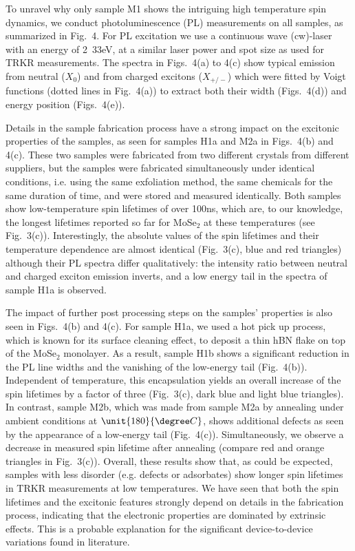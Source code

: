 \documentclass[prb,aps,superscriptaddress,reprint]{revtex4-1}
\begin{document}
To unravel why only sample M1 shows the intriguing high temperature spin dynamics, we conduct photoluminescence (PL) measurements on all samples, as summarized in Fig.~4. For PL excitation we use a continuous wave (cw)-laser with an energy of \unit{2.33}{eV}, at a similar laser power and spot size as used for TRKR measurements. The spectra in Figs.~4(a) to 4(c) show typical emission from neutral ($X_0$) and from charged excitons ($X_{+/-}$) which were fitted by Voigt functions (dotted lines in Fig.~4(a)) to extract both their width (Figs.~4(d)) and energy position (Figs.~4(e)).

Details in the sample fabrication process have a strong impact on the excitonic properties of the samples, as seen for samples H1a and M2a in Figs.~4(b) and 4(c). These two samples were fabricated from two different crystals from different suppliers, but the samples were fabricated simultaneously under identical conditions, i.e. using the same exfoliation method, the same chemicals for the same duration of time, and were stored and measured identically. Both samples show low-temperature spin lifetimes of over \unit{100}{ns}, which are, to our knowledge, the longest lifetimes reported so far for MoSe$_2$ at these temperatures (see Fig.~3(c)). Interestingly, the absolute values of the spin lifetimes and their temperature dependence are almost identical (Fig.~3(c), blue and red triangles) although their PL spectra differ qualitatively: the intensity ratio between neutral and charged exciton emission inverts, and a low energy tail in the spectra of sample H1a is observed. 

The impact of further post processing steps on the samples' properties is also seen in Figs.~4(b) and 4(c). For sample H1a, we used a hot pick up process, which is known for its surface cleaning effect,\cite{arXiv180300912P} to deposit a thin hBN flake on top of the MoSe$_2$ monolayer. As a result, sample H1b shows a significant reduction in the PL line widths and the vanishing of the low-energy tail (Fig.~4(b)). Independent of temperature, this encapsulation yields an overall increase of the spin lifetimes by a factor of three (Fig.~3(c), dark blue and light blue triangles). In contrast, sample M2b, which was made from sample M2a by annealing under ambient conditions at $\unit{180}{\degree C}$, 
shows additional defects as seen by the appearance of a low-energy tail 
(Fig.~4(c)). Simultaneously, we observe a decrease in measured spin lifetime after annealing (compare red and orange triangles in Fig.~3(c)). Overall, these results show that, as could be expected, samples with less disorder (e.g. defects or adsorbates) show longer spin lifetimes in TRKR measurements at low temperatures. We have seen that both the spin lifetimes and the excitonic features strongly depend on details in the fabrication process, indicating that the electronic properties are dominated by extrinsic effects. This is a probable explanation for the significant device-to-device variations found in literature.
\end{document}
